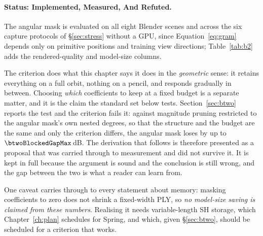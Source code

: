 \paragraph{Status: Implemented, Measured, And Refuted.} The angular mask is evaluated on all
eight Blender scenes and across the six capture protocols of
\S\ref{sec:stress} without a GPU, since Equation~\eqref{eq:gram} depends only on
primitive positions and training view directions; Table~\ref{tab:b2} adds the
rendered-quality and model-size columns.

The criterion does what this chapter says it does in the \emph{geometric}
sense: it retains everything on a full orbit, nothing on a pencil, and responds
gradually in between. Choosing \emph{which} coefficients to keep at a fixed budget is a separate
matter, and it is the claim the standard set below tests. Section~\ref{sec:btwo} reports the test and the criterion
fails it: against magnitude pruning restricted to the angular mask's own nested degrees, so that the structure and the budget are
the same and only the criterion differs, the angular mask loses by up to
$\btwoBlockedGapMax$\,dB. The derivation that follows is therefore presented as
a proposal that was carried through to measurement and did not survive it. It is
kept in full because the argument is sound and the conclusion is still
wrong, and the gap between the two is what a reader can learn from.

One caveat carries through to every statement about memory: masking coefficients
to zero does not shrink a fixed-width PLY, so \emph{no model-size saving is
claimed from these numbers}. Realising it needs variable-length SH storage,
which Chapter~\ref{ch:plan} schedules for Spring, and which, given
\S\ref{sec:btwo}, should be scheduled for a criterion that works.
